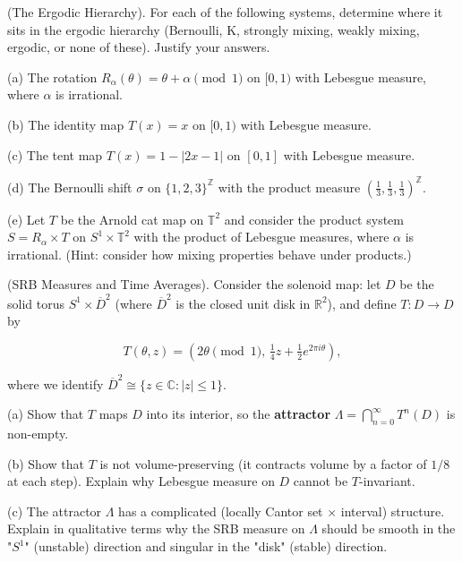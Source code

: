 \begin{exercise}
(The Ergodic Hierarchy). For each of the following systems, determine where it sits in the ergodic hierarchy (Bernoulli, K, strongly mixing, weakly mixing, ergodic, or none of these). Justify your answers.

(a) The rotation $R_\alpha(\theta) = \theta + \alpha \pmod{1}$ on $[0,1)$ with Lebesgue measure, where $\alpha$ is irrational.

(b) The identity map $T(x) = x$ on $[0,1)$ with Lebesgue measure.

(c) The tent map $T(x) = 1 - |2x - 1|$ on $[0,1]$ with Lebesgue measure.

(d) The Bernoulli shift $\sigma$ on $\{1, 2, 3\}^\mathbb{Z}$ with the product measure $(\frac{1}{3}, \frac{1}{3}, \frac{1}{3})^\mathbb{Z}$.

(e) Let $T$ be the Arnold cat map on $\mathbb{T}^2$ and consider the product system $S = R_\alpha \times T$ on $S^1 \times \mathbb{T}^2$ with the product of Lebesgue measures, where $\alpha$ is irrational. (Hint: consider how mixing properties behave under products.)


\bigskip

\end{exercise}


\begin{exercise}
(SRB Measures and Time Averages). Consider the solenoid map: let $D$ be the solid torus $S^1 \times \overline{D}^2$ (where $\overline{D}^2$ is the closed unit disk in $\mathbb{R}^2$), and define $T: D \to D$ by

\[
T(\theta, z) = (2\theta \pmod{1}, \, \tfrac{1}{4}z + \tfrac{1}{2}e^{2\pi i \theta}),
\]

where we identify $\overline{D}^2 \cong \{z \in \mathbb{C} : |z| \leq 1\}$.

(a) Show that $T$ maps $D$ into its interior, so the \textbf{attractor} $\Lambda = \bigcap_{n=0}^{\infty} T^n(D)$ is non-empty.

(b) Show that $T$ is not volume-preserving (it contracts volume by a factor of $1/8$ at each step). Explain why Lebesgue measure on $D$ cannot be $T$-invariant.

(c) The attractor $\Lambda$ has a complicated (locally Cantor set $\times$ interval) structure. Explain in qualitative terms why the SRB measure on $\Lambda$ should be smooth in the "$S^1$" (unstable) direction and singular in the "disk" (stable) direction.


\bigskip

\end{exercise}


